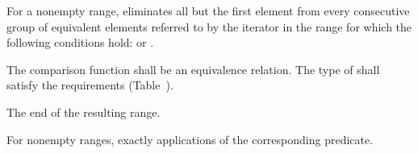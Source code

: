 \begin{itemdescr}
\pnum
\effects
For a nonempty range, eliminates all but the first element from every
consecutive group of equivalent elements referred to by the iterator
in the range
for which the following conditions hold:
or
.

\begin{removedblock}
\pnum
\requires
The comparison function shall be an equivalence relation.
The type of  shall satisfy the
 requirements (Table~).
\end{removedblock}

\pnum
\returns
The end of the resulting range.

\pnum
\complexity
For nonempty ranges, exactly
applications of the corresponding predicate.
\end{itemdescr}


